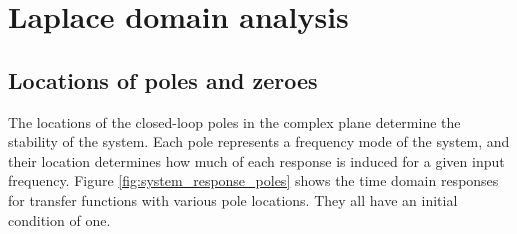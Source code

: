
\chapter{Laplace domain analysis}

\section{Locations of poles and zeroes}

The locations of the closed-loop poles in the complex plane determine the
stability of the \gls{system}. Each pole represents a frequency mode of the
\gls{system}, and their location determines how much of each response is induced
for a given input frequency. Figure \ref{fig:system_response_poles} shows the
time domain responses for transfer functions with various pole locations. They
all have an initial condition of one.

